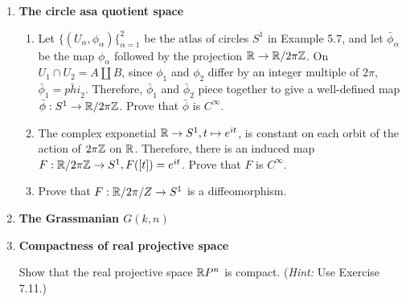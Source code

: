 \documentclass[10pt,a4paper]{report}
\begin{document}
\begin{enumerate}[label=7.\arabic*.]
	\item \textbf{The circle asa quotient space}
	
	\begin{enumerate}[label=(\alph*)]
	
		\item Let $\{(U_\alpha, \phi_\alpha)\{_{\alpha=1}^2$ be the atlas of circles $S^1$ in Example 5.7, and let $\bar{\phi}_\alpha$ be the map $\phi_\alpha$ followed by the projection $\mathbb{R} \to \mathbb{R}/2\pi\mathbb{Z}$.  On $U_1\cap U_2 = A \coprod B$, since $\phi_1$ and $\phi_2$ differ by an integer multiple of $2\pi$, $\bar{\phi}_1 = \bar{phi}_2$.  Therefore, $\bar{\phi}_1$ and $\bar{\phi}_2$ piece together to give a well-defined map $\bar{\phi}: S^1\to \mathbb{R}/2\pi\mathbb{Z}$.  Prove that $\bar{\phi}$ is $C^\infty$.
		
		\item The complex exponetial $\mathbb{R} \to S^1, t\mapsto e^{it}$, is constant on each orbit of the action of $2\pi\mathbb{Z}$ on $\mathbb{R}$.  Therefore, there is an induced map $F: \mathbb{R}/2\pi\mathbb{Z} \to S^1, F([t])=e^{it}$.  Prove that $F$ is $C^\infty$.
		
		\item Prove that $F: \mathbb{R}/2\pi/Z \to S^1$ is a diffeomorphism.
	
	\end{enumerate}
	
	\item \textbf{The Grassmanian $G(k,n)$}
	
	\item \textbf{Compactness of real projective space}
	
	Show that the real projective space $\mathbb{R} P^n$ is compact. (\textit{Hint:} Use Exercise 7.11.)
	

\end{enumerate}
\end{document}
